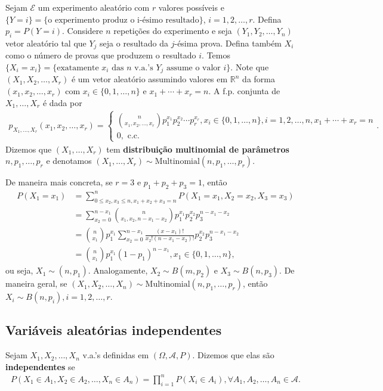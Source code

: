 \documentclass[../Notas.tex]{subfiles}
\begin{document}
\begin{example}
Sejam $\mathcal{E}$ um experimento aleatório com $r$ valores possíveis e $\{Y = i\} = \{\text{o experimento produz o i-ésimo resultado}\}$, $i=1,2,\dots,r$. Defina $p_i = P(Y=i)$. Considere $n$ repetições do experimento e seja $(Y_1, Y_2, \dots, Y_n)$ vetor aleatório tal que $Y_j$ seja o resultado da $j$-ésima prova. Defina também $X_i$ como o número de provas que produzem o resultado $i$. Temos $\{X_i=x_i\} = \{\text{exatamente } x_i \text{ das } n \text{ v.a.'s } Y_j \text{ assume o valor }i\}$. Note que $(X_1, X_2, \dots, X_r)$ é um vetor aleatório assumindo valores em $\mathbb{R}^n$ da forma $(x_1, x_2, \dots, x_r)$ com $x_i\in\{0,1,\dots,n\}$ e $x_1+\cdots+x_r = n$. A f.p. conjunta de $X_1, \dots, X_r$ é dada por
\begin{align*}
    p_{X_1, \dots, X_r}(x_1, x_2, \dots, x_r) = \begin{cases}
        \binom{n}{x_1, x_2,\dots, x_r}p_1^{x_1}p_2^{x_2}\cdots p_r^{x_r}, x_i\in\{0,1,\dots, n\}, i=1,2,\dots,n, x_1+\cdots+x_r=n \\
        0, \text{ c.c.}
    \end{cases}.
\end{align*}
Dizemos que $(X_1, \dots, X_r)$ tem \textbf{distribuição multinomial de parâmetros} $n, p_1, \dots, p_r$ e denotamos $(X_1, \dots, X_r)\sim\text{Multinomial}(n,p_1,\dots,p_r)$.

De maneira mais concreta, se $r=3$ e $p_1 + p_2 + p_3 = 1$, então
\begin{align*}
    P(X_1=x_1) &= \sum_{0\leq x_2,x_3\leq n, x_1+x_2+x_3 = n}^{n}P(X_1=x_1, X_2=x_2, X_3=x_3) \\
    &= \sum_{x_2=0}^{n-x_1}\binom{n}{x_1,x_2,n-x_1-x_2}p_1^{x_1}p_2^{x_2}p_3^{n-x_1-x_2} \\
    &= \binom{n}{x_1}p_1^{x_1}\sum_{x_2=0}^{n-x_1}\frac{(x-x_1)!}{x_2!(n-x_1-x_2)!}p_2^{x_2}p_3^{n-x_1-x_2} \\
    &= \binom{n}{x_1}p_1^{x_1}(1-p_1)^{n-x_1}, x_1\in\{0,1,\dots,n\},
\end{align*}
ou seja, $X_1\sim (n,p_1)$. Analogamente, $X_2\sim B(m,p_2)$ e $X_3\sim B(n,p_3)$. De maneira geral, se $(X_1, X_2, \dots, X_n)\sim\text{Multinomial}(n,p_1,\dots,p_r)$, então $X_i\sim B(n,p_i), i=1,2,\dots,r$.
\end{example}

\subsection{Variáveis aleatórias independentes}
\begin{definition}[V.a.'s independentes]
Sejam $X_1, X_2, \dots, X_n$ v.a.'s definidas em $(\Omega, \mathcal{A}, P)$. Dizemos que elas são \textbf{independentes} se 
\begin{align*}
    P(X_1\in A_1, X_2\in A_2, \dots, X_n\in A_n) = \prod_{i=1}^{n}P(X_i\in A_i), \forall A_1, A_2, \dots, A_n\in\mathcal{A}.
\end{align*}
\end{definition}
\end{document}
